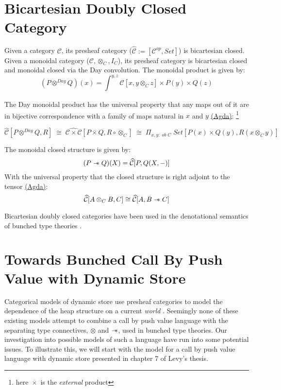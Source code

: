 \documentclass{article}
\newcommand{\sep}{\mathrel{-\mkern-6mu*}}
\newcommand{\pshC}{\widehat{\mathcal{C}}}
\newcommand{\pshCC}{\widehat{\mathcal{C \times C}}}
\newcommand{\dayprod}{\otimes^{Day}}
\begin{document}
\section{Bicartesian Doubly Closed Category}
Given a category $\mathcal{C}$, its presheaf category ($\pshC := [\mathcal{C}^{op}, Set]$)
is bicartesian closed. Given a monoidal category ($\mathcal{C}, \otimes_C , I_C$), 
its presheaf category is bicartesian closed and monoidal closed via the Day convolution. 
The monoidal product is given by:
\[
    (P \dayprod Q)(x) = \int_{}^{y,z} \mathcal{C}[ x , y \otimes_C z ] 
    \times P(y) \times Q(z)
\]

The Day monoidal product has the universal property that any maps out of it are in bijective
correspondence with a family of maps natural in $x$ and $y$ 
\href{https://github.com/bond15/Bunched-CBPV/blob/82136dc6f4f9e4034391877f0d959a6ff1b62dfc/src/Data/BiDCC.agda#L222}
{(Agda)}: 
\footnote{here $\overline{\times}$ is the \textit{external} product}


\[
    \pshC[P \dayprod Q , R] \;\cong \; \pshCC [ P \overline{\times} Q , R \circ \otimes_C ]\; \cong \; \Pi_{x, y : \;ob \;C}\; Set[P(x) \times Q(y) , R(x \otimes_C y)]
\]

The monoidal closed structure is given by: 
\begin{align*}
    (P \sep Q)(X) = \pshC[P , Q(X , -)]
\end{align*}
With the universal property that the closed structure is right adjoint to the tensor
\href{https://github.com/bond15/Bunched-CBPV/blob/82136dc6f4f9e4034391877f0d959a6ff1b62dfc/src/Data/BiDCC.agda#L354}{(Agda)}: 
\begin{align}
    \pshC [ A \otimes_C B , C] \cong \pshC [ A , B \sep C]
\end{align}

Bicartesian doubly closed categories have been used in the denotational semantics of bunched type theories 
\cite{pym_semantics_2002}\cite{bieringLogicBunchedImplications}\cite{ohearn_bunched_2003}.

\section{Towards Bunched Call By Push Value with Dynamic Store}
Categorical models of dynamic store use presheaf categories to model the dependence of the heap structure on a current \textit{world}
\cite{CBPVbook}\cite{sterling_denotational_2023}\cite{kammarMonadFullGround2017}. Seemingly none of these existing models 
attempt to combine a call by push value language with the separating type connectives, $\otimes$ and $\sep$, used in bunched type theories.
Our investigation into possible models of such a language have run into some potential issues. To illustrate this, we will start with the 
model for a call by push value language with dynamic store presented in chapter 7 of Levy's thesis.
\end{document}
